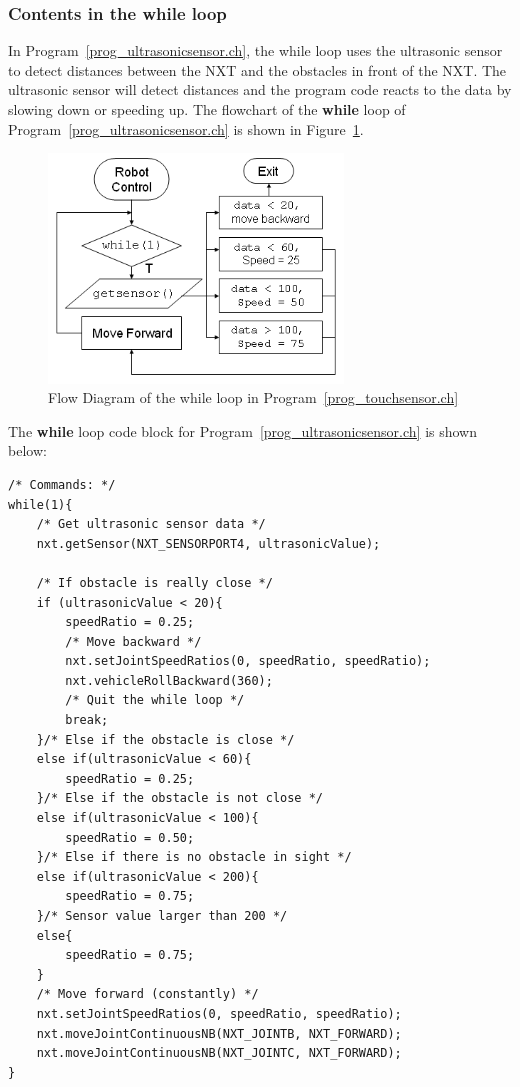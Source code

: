 \documentclass[11pt]{article}
\begin{document}
\subsubsection*{Contents in the while loop}
In Program~\ref{prog_ultrasonicsensor.ch}, the while loop uses the ultrasonic 
sensor to detect distances between the NXT and the obstacles in front of the 
NXT. The ultrasonic sensor will detect distances and the program code reacts 
to the data by slowing down or speeding up. The flowchart of the {\bf while} 
loop of Program~\ref{prog_ultrasonicsensor.ch} is shown in 
Figure~\ref{fig_NXT_ultraflow}.\\
\begin{figure}[h]
  \begin{center}
    \includegraphics[height=2.4in]{figure/mindstorm/NXT_ultraflow.png}
    \caption{Flow Diagram of the while loop in Program~\ref{prog_touchsensor.ch} 
    \label{fig_NXT_ultraflow}}
  \end{center}
\end{figure}
The {\bf while} loop code block for Program~\ref{prog_ultrasonicsensor.ch} is shown below:
\begin{lstlisting}
/* Commands: */
while(1){
    /* Get ultrasonic sensor data */
    nxt.getSensor(NXT_SENSORPORT4, ultrasonicValue);
        
    /* If obstacle is really close */
    if (ultrasonicValue < 20){
        speedRatio = 0.25;
        /* Move backward */
        nxt.setJointSpeedRatios(0, speedRatio, speedRatio);
        nxt.vehicleRollBackward(360);
        /* Quit the while loop */
        break;
    }/* Else if the obstacle is close */
    else if(ultrasonicValue < 60){
        speedRatio = 0.25;
    }/* Else if the obstacle is not close */
    else if(ultrasonicValue < 100){
        speedRatio = 0.50;
    }/* Else if there is no obstacle in sight */
    else if(ultrasonicValue < 200){
        speedRatio = 0.75;
    }/* Sensor value larger than 200 */
    else{
        speedRatio = 0.75;
    }
    /* Move forward (constantly) */
    nxt.setJointSpeedRatios(0, speedRatio, speedRatio);
    nxt.moveJointContinuousNB(NXT_JOINTB, NXT_FORWARD);
    nxt.moveJointContinuousNB(NXT_JOINTC, NXT_FORWARD);
}
\end{lstlisting}
\end{document}
